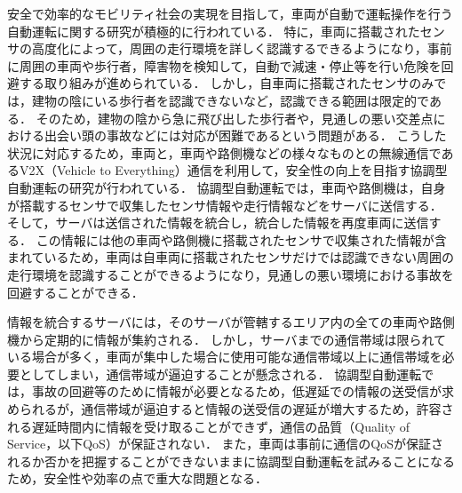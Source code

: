 \documentclass[a4paper,11pt,uplatex]{ujreport}
\begin{document}
    安全で効率的なモビリティ社会の実現を目指して，車両が自動で運転操作を行う自動運転に関する研究が積極的に行われている\cite{AD}．
    特に，車両に搭載されたセンサの高度化によって，周囲の走行環境を詳しく認識するできるようになり，事前に周囲の車両や歩行者，障害物を検知して，自動で減速・停止等を行い危険を回避する取り組みが進められている．
    しかし，自車両に搭載されたセンサのみでは，建物の陰にいる歩行者を認識できないなど，認識できる範囲は限定的である．
    そのため，建物の陰から急に飛び出した歩行者や，見通しの悪い交差点における出会い頭の事故などには対応が困難であるという問題がある．
    こうした状況に対応するため，車両と，車両や路側機などの様々なものとの無線通信であるV2X（Vehicle to Everything）通信を利用して，安全性の向上を目指す協調型自動運転の研究が行われている\cite{CAD, ITS}．
    協調型自動運転では，車両や路側機は，自身が搭載するセンサで収集したセンサ情報や走行情報などをサーバに送信する．
    そして，サーバは送信された情報を統合し，統合した情報を再度車両に送信する．
    この情報には他の車両や路側機に搭載されたセンサで収集された情報が含まれているため，車両は自車両に搭載されたセンサだけでは認識できない周囲の走行環境を認識することができるようになり，見通しの悪い環境における事故を回避することができる．\par
    情報を統合するサーバには，そのサーバが管轄するエリア内の全ての車両や路側機から定期的に情報が集約される．
    しかし，サーバまでの通信帯域は限られている場合が多く，車両が集中した場合に使用可能な通信帯域以上に通信帯域を必要としてしまい，通信帯域が逼迫することが懸念される．
    協調型自動運転では，事故の回避等のために情報が必要となるため，低遅延での情報の送受信が求められるが，通信帯域が逼迫すると情報の送受信の遅延が増大するため，許容される遅延時間内に情報を受け取ることができず，通信の品質（Quality of Service，以下QoS）が保証されない．
    また，車両は事前に通信のQoSが保証されるか否かを把握することができないままに協調型自動運転を試みることになるため，安全性や効率の点で重大な問題となる．
\end{document}
